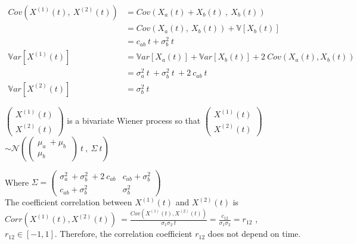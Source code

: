 \begin{align*}
Cov \left(X^{(1)}(t),\ X^{(2)}(t)\right)&= Cov( X_a(t)+X_b(t)\ ,\ X_b(t))\\
&=Cov( X_a(t),\ X_b(t))+ \mathbb{V}[X_b(t)]\\
&=  c_{ab}\ t+\sigma_b^2\ t \\
\mathbb{V}ar[X^{(1)}(t)]&= \mathbb{V}ar[X_a(t)]+\mathbb{V}ar[X_b(t)]+ 2\ Cov (X_a(t),X_b(t))\\
 &=\sigma_a^2\ t\ +\sigma_b^2\ t\ +2\  c_{ab} \ t\\
 \mathbb{V}ar[X^{(2)}(t)]&=\sigma^2_b\ t 
\end{align*}


\noindent $\begin{pmatrix}
X^{(1)}(t)\\
X^{(2)}(t)
\end{pmatrix}$ is a bivariate Wiener process so that 
$\begin{pmatrix}
X^{(1)}(t)\\
X^{(2)}(t)
\end{pmatrix}$
$\sim \mathcal{N}\left( \begin{pmatrix}
\mu_a\ +\mu_b\  \\ \mu_b \ 
\end{pmatrix}\  t\ , \ \Sigma\ t \right)$ 

\noindent Where $\Sigma= \begin{pmatrix}
\sigma_a^2\ +\sigma_b^2\ +2\  c_{ab}  &  c_{ab}+\sigma_b^2 \\
 c_{ab}+ \sigma_b^2 & \sigma_b^2
\end{pmatrix}$\\

\noindent The coefficient correlation between $X^{(1)}(t)$ and $X^{(2)}(t)$ is $Corr(X^{(1)}(t),X^{(2)}(t)) \ =\frac{Cov(X^{(1)}(t),X^{(2)}(t))}{\sigma_1 \sigma_2\ t}=\frac{c_{12}}{\sigma_1\sigma_2}=r_{12}$ , $ r_{12}\in [-1,1]$. Therefore, the correlation coefficient $r_{12}$ does not depend on time. \\



%


